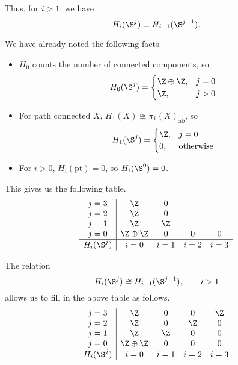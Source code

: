 \documentclass[main.tex]{subfiles}
\begin{document}
\begin{example}
  Thus, for $i > 1$, we have
  \begin{equation*}
    H_{i}(\S^{j}) \equiv H_{i-1}(\S^{j-1}).
  \end{equation*}

  We have already noted the following facts.
  \begin{itemize}
    \item $H_{0}$ counts the number of connected components, so
      \begin{equation*}
        H_{0}(\S^{j}) =
        \begin{cases}
          \Z \oplus \Z, & j = 0 \\
          \Z, & j > 0
        \end{cases}
      \end{equation*}
    \item For path connected $X$, $H_{1}(X) \cong \pi_{1}(X)_{\mathrm{ab}}$, so
      \begin{equation*}
        H_{1}(\S^{j}) =
        \begin{cases}
          \Z, & j = 0 \\
          0, &\text{otherwise}
        \end{cases}
      \end{equation*}
    \item For $i > 0$, $H_{i}(\mathrm{pt}) = 0$, so $H_{i}(\S^{0}) = 0$.
  \end{itemize}
  This gives us the following table.
  \begin{equation*}
    \begin{array}{c|cccc}
      j = 3
      & \Z
      & 0
      \\
      j = 2
      & \Z
      & 0
      \\
      j = 1
      & \Z
      & \Z
      \\
      j = 0
      & \Z \oplus \Z
      & 0
      & 0
      & 0
      \\
      \hline
      H_{i}(\S^{j})
      & i = 0
      & i = 1
      & i = 2
      & i = 3
    \end{array}
  \end{equation*}

  The relation
  \begin{equation*}
    H_{i}(\S^{j}) \cong H_{i-1}(\S^{j-1}),\qquad i > 1
  \end{equation*}
  allows us to fill in the above table as follows.
  \begin{equation}
    \label{eq:homology_groups_of_spheres}
    \begin{array}{c|cccc}
      j = 3
      & \Z
      & 0
      & 0
      & \Z
      \\
      j = 2
      & \Z
      & 0
      & \Z
      & 0
      \\
      j = 1
      & \Z
      & \Z
      & 0
      & 0
      \\
      j = 0
      & \Z \oplus \Z
      & 0
      & 0
      & 0
      \\
      \hline
      H_{i}(\S^{j})
      & i = 0
      & i = 1
      & i = 2
      & i = 3
    \end{array}
  \end{equation}
\end{example}
\end{document}
